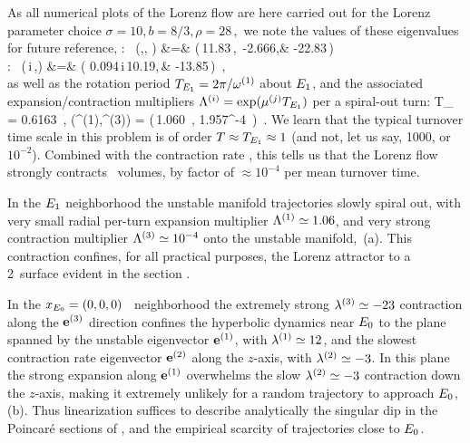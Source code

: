 As all numerical plots of the Lorenz flow are
here carried out for the Lorenz parameter choice
\(
    \sigma = 10, b= 8/3, \rho = 28
\,,
\)
we note the values of these eigenvalues for future reference,
\beq
{}
:~
(\eigExp[1],\eigExp[2], \eigExp[3])
    &=& (\,11.83\,,~-2.666,& -22.83\,)   \\
:~
(\eigRe[1] \pm\,i\,\eigIm[1],\eigExp[3])
    &=& (\,\,0.094\,\pm i\,10.19,\,& -13.85\,) \,, \\
\earr
\label{EqLorenzStab}
\eeq
as
well as the rotation period
$T_{\EQV{1}} = 2\pi/\eigIm[1]$ about $\EQV{1}$,
and the  associated expansion/contraction multipliers
$\ExpaEig^{(i)} = \exp(\eigRe[j] T_{\EQV{1}})$
per a spiral-out turn:
\beq
T_{} =  0.6163 \,, \qquad
(\ExpaEig^{(1)},\ExpaEig^{(3)})
   = (\,1.060 \,, 1.957^{-4} \,)
\,.
\label{EqLorenzMltp}
\eeq
We learn that the typical turnover time scale in this problem is
of order $T \approx T_{\EQV{1}} \approx 1$
(and not, let us say, 1000, or $10^{-2}$). Combined with
the contraction rate , this tells us that
the Lorenz flow strongly contracts \statesp\ volumes, by factor of
$ \approx 10^{-4}$ per mean turnover time.

In the $\EQV{1}$ neighborhood the unstable manifold
trajectories slowly spiral out, with
very small radial  per-turn expansion multiplier
$\ExpaEig^{(1)} \simeq  1.06$,
and very strong contraction multiplier
$\ExpaEig^{(3)}  \simeq 10^{-4}$
onto the unstable manifold,
\,(a).
This contraction confines, for all practical purposes,
the Lorenz attractor to a 2\dmn\ surface
evident in the section .


In the $\ssp_{\EQV{0}} = (0,0,0)$ \eqv\ neighborhood the extremely strong
$\eigExp[3] \simeq -23$ contraction along the $\jEigvec[3]$ direction
confines the hyperbolic dynamics near $\EQV{0}$ to the plane
spanned by the unstable eigen\-vector $\jEigvec[1]$,
with $\eigExp[1] \simeq 12$, and
the slowest contraction rate eigen\-vector $\jEigvec[2]$
along the $z$-axis, with $\eigExp[2] \simeq - 3$.
In this plane the strong expansion %
along $\jEigvec[1]$ overwhelms the
slow  $\eigExp[2] \simeq - 3$ contraction down the $z$-axis,
making it extremely unlikely for a random trajectory
to approach $\EQV{0}$, \,(b).
Thus linearization suffices to describe analytically the singular
dip in the Poincar\'e sections of
, and the empirical scarcity
of trajectories close to $\EQV{0}$.


